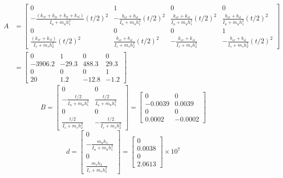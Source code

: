 \documentclass[12pt, a4paper, oneside]{report}
\begin{document}
\begin{align*}
    A & = \begin{bmatrix}
        0 & 1 & 0 & 0 \\
        -\frac{(k_{sr} + k_{tr} + k_{tl} +k_{sl})}{I_u + m_u h_1^2}(t/2)^2 & -\frac{b_{sr}+b_{sl}}{I_u + m_u h_1^2}(t/2)^2 & \frac{k_{sr} + k_{sl}}{I_u + m_u h_1^2}(t/2)^2 & \frac{b_{sr}+b_{sl}}{I_u + m_u h_1^2}(t/2)^2 \\
        0 & 0 & 0 & 1 \\
        \frac{(k_{sr} + k_{sl})}{I_s + m_s h_2^2}(t/2)^2 & \frac{b_{sr}+b_{sl}}{I_s + m_s h_2^2}(t/2)^2 & -\frac{k_{sr} + k_{sl}}{I_s + m_s h_2^2} & -\frac{b_{sr}+b_{sl}}{I_s + m_s h_2^2}(t/2)^2
    \end{bmatrix} \\
    & = \begin{bmatrix}
        0 & 1 & 0 & 0 \\
        -3906.2 & -29.3 & 488.3 & 29.3 \\
        0 & 0 & 0 & 1 \\
        20 & 1.2 & -12.8 & -1.2
    \end{bmatrix}
\end{align*}
\begin{equation*}
    B = \begin{bmatrix}
        0 & 0 \\
        -\frac{t/2}{I_u + m_u h_1^2} & \frac{t/2}{I_u + m_u h_1^2} \\
        0 & 0 \\
        \frac{t/2}{I_s + m_s h_2^2} & -\frac{t/2}{I_s + m_s h_2^2}
    \end{bmatrix} 
    = \begin{bmatrix}
        0 & 0 \\
        -0.0039 & 0.0039 \\
        0 & 0 \\
        0.0002 & -0.0002
    \end{bmatrix}
\end{equation*}
\begin{equation*}
    d = \begin{bmatrix}
        0 \\
        -\frac{m_u h_1}{I_u + m_u h_1^2} \\
        0 \\
        \frac{m_s h_2}{I_s + m_s h_2^2}
    \end{bmatrix}
    = \begin{bmatrix}
        0 \\
        0.0038 \\
        0 \\
        2.0613
    \end{bmatrix} \times 10^{7}
\end{equation*}
\end{document}
